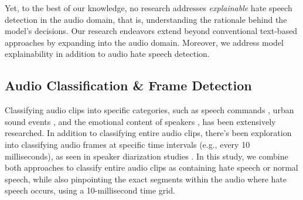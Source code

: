 \documentclass[11pt]{article}
\begin{document}
Yet, to the best of our knowledge, no research addresses \textit{explainable} hate speech detection in the audio domain, that is, understanding the rationale behind the model's decisions. Our research endeavors extend beyond conventional text-based approaches by expanding into the audio domain. Moreover, we address model explainability in addition to audio hate speech detection.




\subsection{Audio Classification \& Frame Detection}

Classifying audio clips into specific categories, such as speech commands \cite{speech_command}, urban sound events \cite{ESC}, and the emotional content of speakers \cite{IEMOCAP}, has been extensively researched. In addition to classifying entire audio clips, there's been exploration into classifying audio frames at specific time intervals (e.g., every 10 milliseconds), as seen in speaker diarization studies \cite{CALLHOME, fujita2019end}. In this study, we combine both approaches to classify entire audio clips as containing hate speech or normal speech, while also pinpointing the exact segments within the audio where hate speech occurs, using a 10-millisecond time grid.







\end{document}

